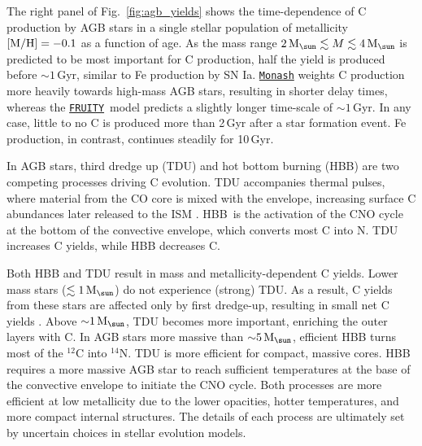 \documentclass[fleqn,
usenatbib]{mnras}
\newcommand{\fruity}{\texttt{\hyperlink{fruity}{FRUITY}}}
\newcommand{\monash}{\texttt{\hyperlink{monash}{Monash}}}
\newcommand{\Mo}{ {\rm M}_{\sun}}
\newcommand{\about}[1]{${\sim} #1$}
\begin{document}
The right panel of Fig.~\ref{fig:agb_yields} shows the time-dependence of C production by AGB stars in a single stellar population of metallicity ${\rm [M/H]} = -0.1$ as a function of age. 
As the mass range $2\,\Mo\lesssim M \lesssim 4\,\Mo$ is predicted to be most important for C production, half the yield is produced before \about{1}\,Gyr, similar to Fe production by SN Ia. 
\monash{} weights C production more heavily towards high-mass AGB stars, resulting in shorter delay times, whereas the \fruity\ model predicts a slightly longer time-scale of \about{1}\,Gyr. In any case, little to no C is produced more than 2\,Gyr after a star formation event. Fe production, in contrast, continues steadily for 10\,Gyr. 

In AGB stars, {third dredge up} (TDU) and {hot bottom burning} (HBB) are two competing processes driving C evolution.
TDU accompanies thermal pulses, where material from the CO core is mixed with the envelope, increasing surface C abundances 
later released to the ISM \citep{KL14}.  
HBB\ is the activation of the CNO cycle at the bottom of the convective envelope, which converts most C into N.
TDU increases C yields, while HBB decreases C. 



Both HBB and TDU result in mass and metallicity-dependent C yields. 
Lower mass stars ($\lesssim 1\,\Mo$)  do not experience (strong) TDU. As a result, C yields from these stars are affected only by first dredge-up, resulting in small net C yields \citep{karakas10}.
Above ${\sim}1\,\Mo$, TDU becomes more important, enriching the outer layers with C.
In AGB stars more massive than ${\sim}5\,\Mo$, efficient HBB turns most of the $^{12}$C into $^{14}$N.
TDU is more efficient for compact, massive cores. HBB requires a more massive AGB star to reach sufficient temperatures at the base of the convective envelope to initiate the CNO cycle. Both processes are more efficient at low metallicity due to the lower opacities, hotter temperatures, and more compact internal structures. The details of each process are ultimately set by uncertain choices in stellar evolution models. 
\end{document}
